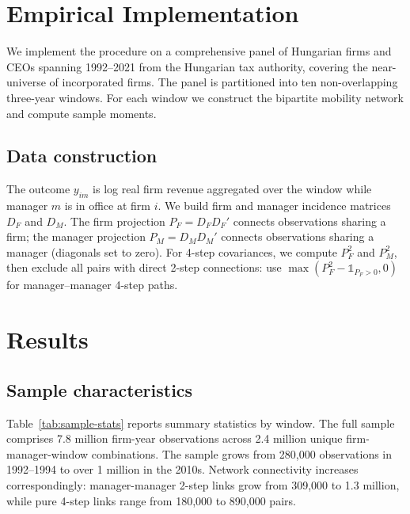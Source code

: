 \documentclass[9pt,twocolumn,twoside]{pnas-new}
\begin{document}
\section*{Empirical Implementation}

We implement the procedure on a comprehensive panel of Hungarian firms and CEOs spanning 1992--2021 from the Hungarian tax authority, covering the near-universe of incorporated firms. The panel is partitioned into ten non-overlapping three-year windows. For each window we construct the bipartite mobility network and compute sample moments.

\subsection*{Data construction}
The outcome $y_{im}$ is log real firm revenue aggregated over the window while manager $m$ is in office at firm $i$. We build firm and manager incidence matrices $D_F$ and $D_M$. The firm projection $P_F = D_F D_F'$ connects observations sharing a firm; the manager projection $P_M = D_M D_M'$ connects observations sharing a manager (diagonals set to zero). For 4-step covariances, we compute $P_F^2$ and $P_M^2$, then exclude all pairs with direct 2-step connections: use $\max(P_F^2 - \mathbb{1}_{P_F>0}, 0)$ for manager--manager 4-step paths.

\section*{Results}

\subsection*{Sample characteristics}
Table~\ref{tab:sample-stats} reports summary statistics by window. The full sample comprises 7.8 million firm-year observations across 2.4 million unique firm-manager-window combinations. The sample grows from 280,000 observations in 1992--1994 to over 1 million in the 2010s. Network connectivity increases correspondingly: manager-manager 2-step links grow from 309,000 to 1.3 million, while pure 4-step links range from 180,000 to 890,000 pairs.
\end{document}
